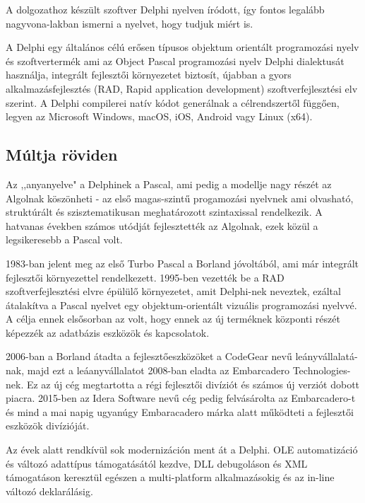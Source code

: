 
A dolgozathoz készült szoftver Delphi nyelven íródott, így fontos legalább nagyvona\hyp{}lakban ismerni a nyelvet, hogy tudjuk miért is.

A Delphi egy általános célú erősen típusos objektum orientált programozási nyelv és szoftvertermék ami az Object Pascal programozási nyelv Delphi dialektusát használja, integrált fejlesztői környezetet biztosít, újabban a gyors alkalmazásfejlesztés (RAD, Rapid application development) szoftverfejlesztési elv szerint. A Delphi compilerei natív kódot generálnak a célrendszertől függően, legyen az Microsoft Windows, macOS, iOS, Android vagy Linux (x64).

\textit{\cite{delphi:001}}

\subsection{Múltja röviden}
Az ,,anyanyelve" a Delphinek a Pascal, ami pedig a modellje nagy részét az Algolnak köszönheti - az első magas-szintű progamozási nyelvnek ami olvasható, struktúrált és szisztematikusan meghatározott szintaxissal rendelkezik. A hatvanas években számos utódját fejlesztették az Algolnak, ezek közül a legsikeresebb a Pascal volt.

1983-ban jelent meg az első Turbo Pascal a Borland jóvoltából, ami már integrált fejlesztői környezettel rendelkezett. 1995-ben vezették be a RAD szoftverfejlesztési elvre épülülő környezetet, amit Delphi-nek neveztek, ezáltal átalakítva a Pascal nyelvet egy objektum-orientált vizuális programozási nyelvvé. A célja ennek elsősorban az volt, hogy ennek az új terméknek központi részét képezzék az adatbázis eszközök és kapcsolatok.

2006-ban a Borland átadta a fejlesztőeszközöket a CodeGear nevű leányvállalatá\hyp{}nak, majd ezt a leáanyvállalatot 2008-ban eladta az Embarcadero Technologies-nek. Ez az új cég megtartotta a régi fejlesztői divíziót és számos új verziót dobott piacra. 2015-ben az Idera Software nevű cég pedig felvásárolta az Embarcadero-t és mind a mai napig ugyanúgy Embaracadero márka alatt működteti a fejlesztői eszközök divízióját.

Az évek alatt rendkívül sok modernizáción ment át a Delphi. OLE automatizáció és változó adattípus támogatásától kezdve, DLL debugoláson és XML támogatáson keresztül egészen a multi-platform alkalmazásokig és az in-line változó deklarálásig.

\textit{\cite{delphi:002}}

